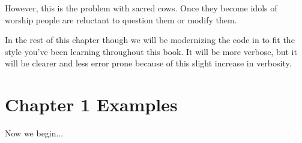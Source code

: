 However, this is the problem with sacred cows.  Once they become idols of
worship people are reluctant to question them or modify them.

In the rest of this chapter though we will be modernizing the code in \krc
to fit the style you've been learning throughout this book.  It will be
more verbose, but it will be clearer and less error prone because of
this slight increase in verbosity.


\section{Chapter 1 Examples}

Now we begin...
